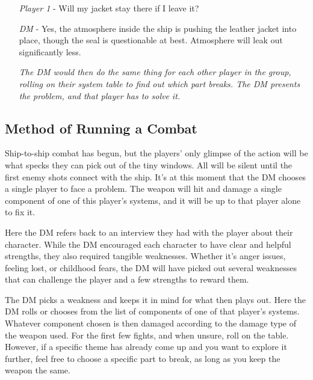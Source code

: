 \documentclass[a4paper]{article}
\begin{document}
\begin{enumerate}[leftmargin=2cm]
\item [\textit{Player 1}] - Will my jacket stay there if I leave it? 
\item [\textit{DM}] - Yes, the atmosphere inside the ship is pushing the leather jacket into place, though the seal is questionable at best. Atmosphere will leak out significantly less.
\item [] \textit{The DM would then do the same thing for each other player in the group, rolling on their system table to find out which part breaks. The DM presents the problem, and that player has to solve it.}
\end{enumerate}

\subsection{Method of Running a Combat}

Ship-to-ship combat has begun, but the players' only glimpse of the action will be what specks they can pick out of the tiny windows. All will be silent until the first enemy shots connect with the ship. It's at this moment that the DM chooses a single player to face a problem. The weapon will hit and damage a single component of one of this player's systems, and it will be up to that player alone to fix it.

Here the DM refers back to an interview they had with the player about their character. While the DM encouraged each character to have clear and helpful strengths, they also required tangible weaknesses. Whether it's anger issues, feeling lost, or childhood fears, the DM will have picked out several weaknesses that can challenge the player and a few strengths to reward them.

The DM picks a weakness and keeps it in mind for what then plays out. Here the DM rolls or chooses from the list of components of one of that player's systems. Whatever component chosen is then damaged according to the damage type of the weapon used. For the first few fights, and when unsure, roll on the table. However, if a specific theme has already come up and you want to explore it further, feel free to choose a specific part to break, as long as you keep the weapon the same.
\end{document}
